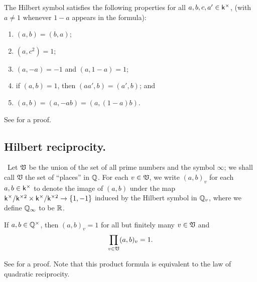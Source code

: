 \begin{theorem}
    The Hilbert symbol satisfies the following properties for all \(a, b, c, a' \in \mathsf{k}^{\times}\), (with \(a \neq 1\) whenever \(1-a\) appears in the formula):

    \smallskip

    \begin{enumerate}[nosep, label=(\alph*)]
        \item \((a, b) = (b, a)\);
        \item \((a, c^2) = 1\);
        \item \((a, -a) = -1\) and \((a, 1-a) = 1\);
        \item if \((a, b) = 1\), then \((aa', b) = (a', b)\); and
        \item \((a, b) = (a, -ab) = (a, (1-a)b)\).
    \end{enumerate}
\end{theorem}

See \cite[pp.~19--21]{serre2012course} for a proof.

\subsection{Hilbert reciprocity.}~Let \(\mathfrak{V}\) be the union of the set of all prime numbers and the symbol \(\infty\); we shall call \(\mathfrak{V}\) the set of ``places'' in \(\mathbb{Q}\). For each \(v \in \mathfrak{V}\), we write \((a, b)_v\) for  each \(a, b \in \mathsf{k}^{\times}\) to denote the image of \((a, b)\) under the map \(\mathsf{k}^{\times}/\mathsf{k}^{\times2} \times \mathsf{k}^{\times}/\mathsf{k}^{\times2} \to \{1, -1\}\) induced by the Hilbert symbol in \(\mathbb{Q}_v\), where we define \(\mathbb{Q}_{\infty}\) to be \(\mathbb{R}\).\label{sec:hilbert-reciprocity}

\begin{theoremx}
    If \(a, b \in \mathbb{Q}^{\times}\), then \((a, b)_v = 1\) for all but finitely many \(v \in \mathfrak{V}\) and 
    \[
        \prod_{v \in \mathfrak{V}} (a, b)_v = 1.
    \]
\end{theoremx}

See \cite[pp.~23--24]{serre2012course} for a proof. Note that this product formula is equivalent to the law of quadratic reciprocity.

